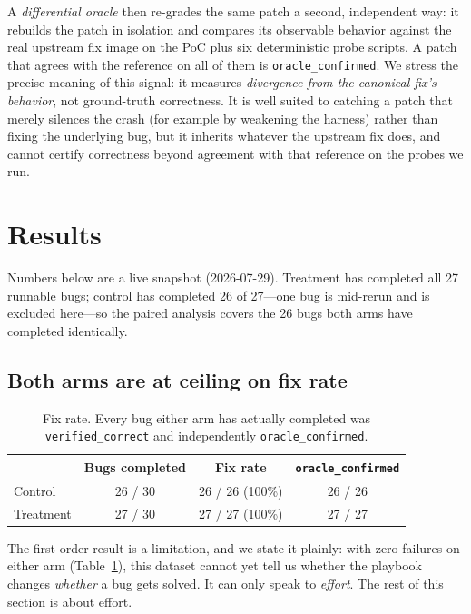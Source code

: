 \documentclass[11pt]{article}
\begin{document}
A \emph{differential oracle} then re-grades the same patch a second, independent
way: it rebuilds the patch in isolation and compares its observable behavior
against the real upstream fix image on the PoC plus six deterministic probe
scripts. A patch that agrees with the reference on all of them is
\texttt{oracle\_confirmed}. We stress the precise meaning of this signal: it
measures \emph{divergence from the canonical fix's behavior}, not ground-truth
correctness. It is well suited to catching a patch that merely silences the crash
(for example by weakening the harness) rather than fixing the underlying bug, but
it inherits whatever the upstream fix does, and cannot certify correctness beyond
agreement with that reference on the probes we run.

\section{Results}
\label{sec:results}

Numbers below are a live snapshot (2026-07-29). Treatment has completed all 27
runnable bugs; control has completed 26 of 27---one bug is mid-rerun and is
excluded here---so the paired analysis covers the 26 bugs both arms have completed
identically.

\subsection{Both arms are at ceiling on fix rate}

\begin{table}[h]
\centering
\small
\begin{tabular}{lccc}
\toprule
& Bugs completed & Fix rate & \texttt{oracle\_confirmed} \\
\midrule
Control   & 26 / 30 & 26 / 26 (100\%) & 26 / 26 \\
Treatment & 27 / 30 & 27 / 27 (100\%) & 27 / 27 \\
\bottomrule
\end{tabular}
\caption{Fix rate. Every bug either arm has actually completed was
\texttt{verified\_correct} and independently \texttt{oracle\_confirmed}.}
\label{tab:fixrate}
\end{table}

The first-order result is a limitation, and we state it plainly: with zero
failures on either arm (Table~\ref{tab:fixrate}), this dataset cannot yet tell us
whether the playbook changes \emph{whether} a bug gets solved. It can only speak
to \emph{effort}. The rest of this section is about effort.
\end{document}
